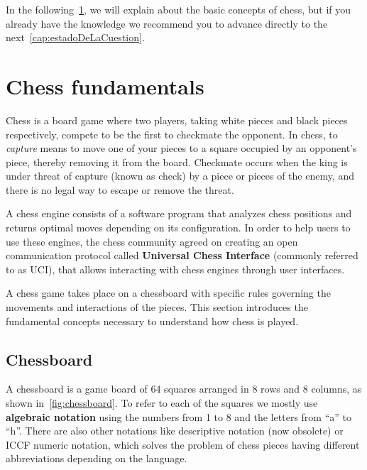 \vspace{1em}

\noindent In the following~\cref{sec:basicConcepts}, we will explain about the basic concepts of chess, but if you already have the knowledge we recommend you to advance directly to the next~\cref{cap:estadoDeLaCuestion}.

\section{Chess fundamentals}\label{sec:basicConcepts}

\noindent Chess is a board game where two players, taking white pieces and black pieces respectively, compete to be the first to checkmate the opponent. In chess, to \textit{capture} means to move one of your pieces to a square occupied by an opponent's piece, thereby removing it from the board. Checkmate occurs when the king is under threat of capture (known as check) by a piece or pieces of the enemy, and there is no legal way to escape or remove the threat.

\vspace{1em}

\noindent A chess engine consists of a software program that analyzes chess positions and returns optimal moves depending on its configuration. In order to help users to use these engines, the chess community agreed on creating an open communication protocol called \textbf{Universal Chess Interface} (commonly referred to as UCI), that allows interacting with chess engines through user interfaces.

\vspace{1em}

\noindent A chess game takes place on a chessboard with specific rules governing the movements and interactions of the pieces. This section introduces the fundamental concepts necessary to understand how chess is played.

\subsection*{Chessboard}\label{sec:chessboard}

A chessboard is a game board of 64 squares arranged in 8 rows and 8 columns, as shown in~\cref{fig:chessboard}. To refer to each of the squares we mostly use \textbf{algebraic notation} using the numbers from 1 to 8 and the letters from ``a'' to ``h''. There are also other notations like descriptive notation (now obsolete) or ICCF numeric notation, which solves the problem of chess pieces having different abbreviations depending on the language.

